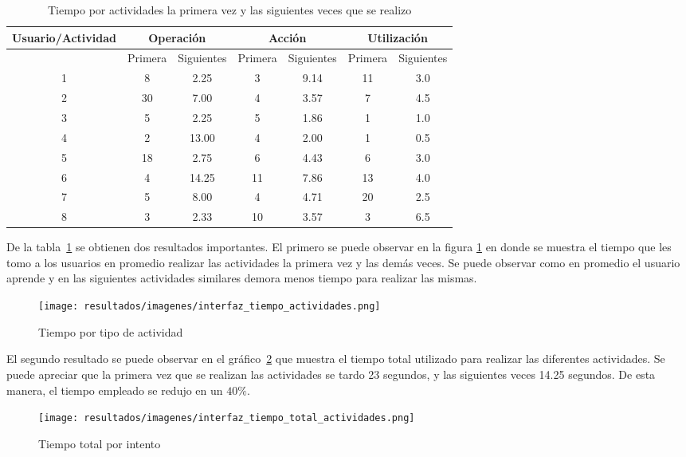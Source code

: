 \begin{table}[!hbt]
\centering
\begin{tabular}{|c|c|c|c|c|c|c|}
\hline
\rowcolor{gris} \textbf{Usuario/Actividad} & \multicolumn{2}{|c|}{\textbf{Operación}} & \multicolumn{2}{|c|}{\textbf{Acción}} & \multicolumn{2}{|c|}{\textbf{Utilización}}\\
\hline
\rowcolor{gris}  & Primera & Siguientes & Primera & Siguientes & Primera & Siguientes \\
\hline 1 & 8  & 2.25  & 3  & 9.14 & 11 & 3.0 \\
\hline 2 & 30 & 7.00  & 4  & 3.57 & 7  & 4.5 \\
\hline 3 & 5  & 2.25  & 5  & 1.86 & 1  & 1.0 \\
\hline 4 & 2  & 13.00 & 4  & 2.00 & 1  & 0.5 \\
\hline 5 & 18 & 2.75  & 6  & 4.43 & 6  & 3.0 \\
\hline 6 & 4  & 14.25 & 11 & 7.86 & 13 & 4.0 \\
\hline 7 & 5  & 8.00  & 4  & 4.71 & 20 & 2.5 \\
\hline 8 & 3  & 2.33  & 10 & 3.57 & 3  & 6.5 \\
\hline
\end{tabular}
\caption{Tiempo por actividades la primera vez y las siguientes veces que se realizo}
\label{tab:interfaz_tiempo_actividades}
\end{table}


De la tabla~\ref{tab:interfaz_tiempo_actividades} se obtienen dos resultados importantes. El primero se puede observar en la figura \ref{fig:interfaz_tiempo_actividades} en donde se muestra el tiempo que les tomo a los usuarios en promedio realizar las actividades la primera vez y las demás veces. Se puede observar como en promedio el usuario aprende y en las siguientes actividades similares demora menos tiempo para realizar las mismas.

\begin{figure}[ht!]
\centering
\texttt{[image: resultados/imagenes/interfaz\_tiempo\_actividades.png]}
\caption{Tiempo por tipo de actividad}
\label{fig:interfaz_tiempo_actividades}
\end{figure}
 
El segundo resultado se puede observar en el gráfico~\ref{fig:interfaz_tiempo_total_actividades} que muestra el tiempo total utilizado para realizar las diferentes actividades. Se puede apreciar que la primera vez que se realizan las actividades se tardo 23 segundos, y las siguientes veces 14.25 segundos. De esta manera, el tiempo empleado se redujo en un $40\%$.
 
\begin{figure}[ht!]
\centering
\texttt{[image: resultados/imagenes/interfaz\_tiempo\_total\_actividades.png]}
\caption{Tiempo total por intento}
\label{fig:interfaz_tiempo_total_actividades}
\end{figure}

